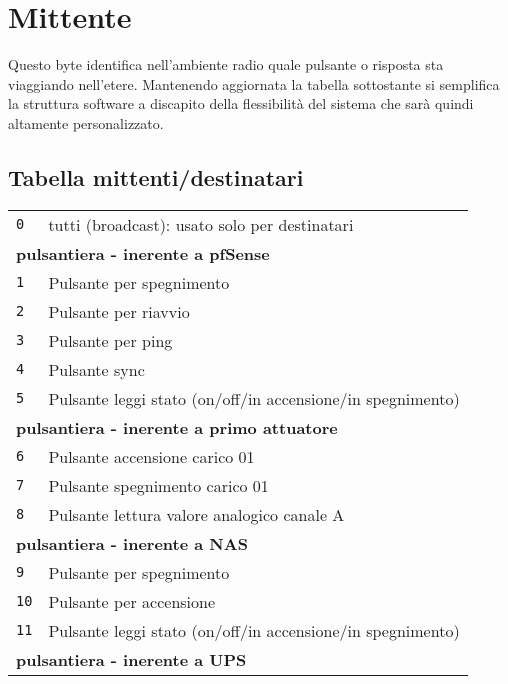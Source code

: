 \documentclass[italian]{article}
\begin{document}
    \section*{Mittente}
    
    Questo byte identifica nell'ambiente radio quale pulsante o risposta sta viaggiando nell'etere. Mantenendo aggiornata la tabella sottostante si semplifica la struttura software a discapito della flessibilità del sistema che sarà quindi altamente personalizzato.
    
    \subsection{Tabella mittenti/destinatari}
    
    

        \begin{tabular}{ll}
            \texttt{0} & tutti (broadcast): usato solo per destinatari\\
            \multicolumn{2}{l}{\textbf{pulsantiera - inerente a pfSense}}\\
            \texttt{1} & Pulsante per spegnimento\\
            \texttt{2} & Pulsante per riavvio\\
            \texttt{3} & Pulsante per ping \\
            \texttt{4} & Pulsante sync \\
            \texttt{5} & Pulsante leggi stato (on/off/in accensione/in spegnimento)\\
            \multicolumn{2}{l}{\textbf{pulsantiera - inerente a primo attuatore}}\\
            \texttt{6} & Pulsante accensione carico 01\\
            \texttt{7} & Pulsante spegnimento carico 01\\
            \texttt{8} & Pulsante lettura valore analogico canale A\\
			\multicolumn{2}{l}{\textbf{pulsantiera - inerente a NAS}}\\
			\texttt{9} & Pulsante per spegnimento\\
			\texttt{10} & Pulsante per accensione\\
			\texttt{11} & Pulsante leggi stato (on/off/in accensione/in spegnimento)\\
			\multicolumn{2}{l}{\textbf{pulsantiera - inerente a UPS}}\\

\end{tabular}
\end{document}
